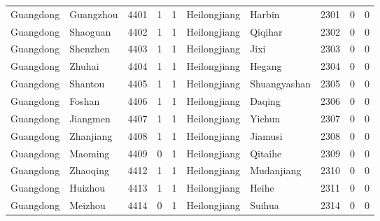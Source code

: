\documentclass[12pt]{article}
\begin{document}
\begin{table}[!htb]
\begin{adjustbox}{width=\textwidth, totalheight=\baselineskip,keepaspectratio}
\begin{tabular}{llllllllll}
Guangdong & Guangzhou & 4401 & 1   & 1   & Heilongjiang & Harbin        & 2301 & 0   & 0   \\
Guangdong & Shaoguan  & 4402 & 1   & 1   & Heilongjiang & Qiqihar       & 2302 & 0   & 0   \\
Guangdong & Shenzhen  & 4403 & 1   & 1   & Heilongjiang & Jixi          & 2303 & 0   & 0   \\
Guangdong & Zhuhai    & 4404 & 1   & 1   & Heilongjiang & Hegang        & 2304 & 0   & 0   \\
Guangdong & Shantou   & 4405 & 1   & 1   & Heilongjiang & Shuangyashan  & 2305 & 0   & 0   \\
Guangdong & Foshan    & 4406 & 1   & 1   & Heilongjiang & Daqing        & 2306 & 0   & 0   \\
Guangdong & Jiangmen  & 4407 & 1   & 1   & Heilongjiang & Yichun        & 2307 & 0   & 0   \\
Guangdong & Zhanjiang & 4408 & 1   & 1   & Heilongjiang & Jiamusi       & 2308 & 0   & 0   \\
Guangdong & Maoming   & 4409 & 0   & 1   & Heilongjiang & Qitaihe       & 2309 & 0   & 0   \\
Guangdong & Zhaoqing  & 4412 & 1   & 1   & Heilongjiang & Mudanjiang    & 2310 & 0   & 0   \\
Guangdong & Huizhou   & 4413 & 1   & 1   & Heilongjiang & Heihe         & 2311 & 0   & 0   \\
Guangdong & Meizhou   & 4414 & 0   & 1   & Heilongjiang & Suihua        & 2314 & 0   & 0  
\end{tabular}
\end{adjustbox}
\end{table}
\end{document}
